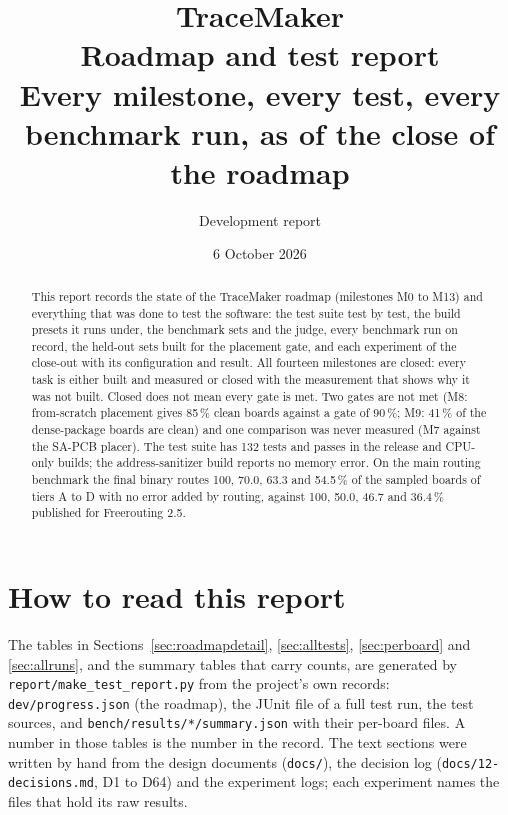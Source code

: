 \documentclass[10pt,a4paper]{article}
\title{\textbf{TraceMaker}\\[2pt]\large Roadmap and test report\\[2pt]
\normalsize Every milestone, every test, every benchmark run, as of the close of the roadmap}
\author{Development report}
\date{6 October 2026}
\newcommand{\code}[1]{\texttt{#1}}
\begin{document}
\maketitle

\begin{abstract}
\noindent This report records the state of the TraceMaker roadmap (milestones M0 to M13) and everything that was
done to test the software: the test suite test by test, the build presets it runs under, the benchmark sets and
the judge, every benchmark run on record, the held-out sets built for the placement gate, and each experiment of
the close-out with its configuration and result. All fourteen milestones are closed: every task is either built
and measured or closed with the measurement that shows why it was not built. Closed does not mean every gate is
met. Two gates are not met (M8: from-scratch placement gives 85\,\% clean boards against a gate of 90\,\%; M9: 41\,\%
of the dense-package boards are clean) and one comparison was never measured (M7 against the SA-PCB placer). The
test suite has 132 tests and passes in the release and CPU-only builds; the address-sanitizer build reports no
memory error. On the main routing benchmark the final binary routes 100, 70.0, 63.3 and 54.5\,\% of the sampled
boards of tiers A to D with no error added by routing, against 100, 50.0, 46.7 and 36.4\,\% published for
Freerouting 2.5.
\end{abstract}

\tableofcontents
\newpage

\section{How to read this report}

The tables in Sections~\ref{sec:roadmapdetail}, \ref{sec:alltests}, \ref{sec:perboard} and \ref{sec:allruns}, and
the summary tables that carry counts, are generated by \code{report/make\_test\_report.py} from the project's own
records: \code{dev/progress.json} (the roadmap), the JUnit file of a full test run, the test sources, and
\code{bench/results/*/summary.json} with their per-board files. A number in those tables is the number in the
record. The text sections were written by hand from the design documents (\code{docs/}), the decision log
(\code{docs/12-decisions.md}, D1 to D64) and the experiment logs; each experiment names the files that hold its
raw results.
\end{document}

